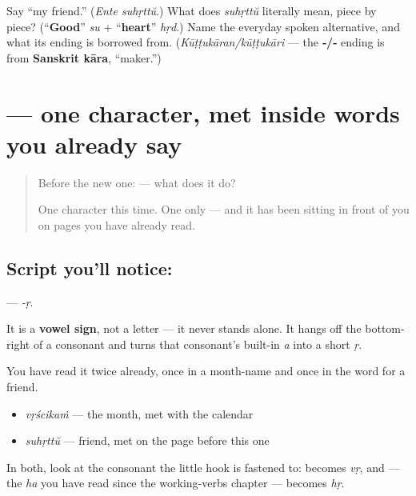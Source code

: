 \begin{tcolorbox}[breakable,colback=teal!4,colframe=teal!35!black,title={Before you move on}]
Say \textquotedblleft{}my friend.\textquotedblright{} (\emph{Ente suhṛttŭ}.) What does \emph{suhṛttŭ} literally mean, piece by piece? (\textquotedblleft{}\textbf{Good}\textquotedblright{} \emph{su} + \textquotedblleft{}\textbf{heart}\textquotedblright{} \emph{hṛd}.) Name the everyday spoken alternative, and what its ending is borrowed from. (\emph{Kūṭṭukāran/kūṭṭukāri} — the \textbf{‑/‑} ending is from \textbf{Sanskrit kāra}, \textquotedblleft{}maker.\textquotedblright{})
\end{tcolorbox}
\section[\texorpdfstring{\ml{ൃ} (-ṛ)}{ൃ (-ṛ)}]{ — one character, met inside words you already say}

\label{lesson:ML-S128-vowel-sign-r}



\begin{quote}
Before the new one:  — what does it do?

One character this time. One only — and it has been sitting in front of you on pages you have already read.
\end{quote}

\subsection*{Script you'll notice: }
\textbf{} — \emph{-ṛ}.

It is a \textbf{vowel sign}, not a letter — it never stands alone. It hangs off the bottom-right of a consonant and turns that consonant's built-in \emph{a} into a short \emph{ṛ}.

You have read it twice already, once in a month-name and once in the word for a friend.

\begin{itemize}
\raggedright
  \item \textbf{} \emph{vṛścikaṁ} — the month, met with the calendar
  \item \textbf{} \emph{suhṛttŭ} — friend, met on the page before this one
\end{itemize}

In both, look at the consonant the little hook is fastened to: \textbf{} becomes \emph{vṛ}, and \textbf{} — the \emph{ha} you have read since the working-verbs chapter — becomes \emph{hṛ}.


